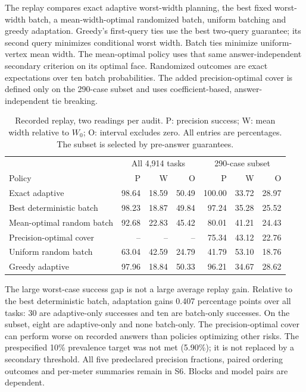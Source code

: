 \documentclass[12pt]{article}
\begin{document}
The replay compares exact adaptive worst-width planning, the best fixed
worst-width batch, a mean-width-optimal randomized batch, uniform batching
and greedy adaptation. Greedy's first-query ties use the best two-query
guarantee; its second query minimizes conditional worst width. Batch ties
minimize uniform-vertex mean width. The mean-optimal policy uses that same
answer-independent secondary criterion on its optimal face. Randomized
outcomes are exact expectations over ten batch probabilities. The added
precision-optimal cover is defined only on the 290-case subset and uses
coefficient-based, answer-independent tie breaking.

\begin{table}[htbp]\centering\small\setlength{\tabcolsep}{4pt}
\caption{Recorded replay, two readings per audit. P: precision success;
W: mean width relative to $W_0$; O: interval excludes zero. All entries
are percentages. The subset is selected by pre-answer guarantees.}
\label{tab:counter-replay}
\begin{tabular}{lrrrrrr}\toprule
 & \multicolumn{3}{c}{All 4,914 tasks} & \multicolumn{3}{c}{290-case subset}\\
Policy & P & W & O & P & W & O\\\midrule
Exact adaptive & 98.64 & 18.59 & 50.49 & 100.00 & 33.72 & 28.97\\
Best deterministic batch & 98.23 & 18.87 & 49.84 & 97.24 & 35.28 & 25.52\\
Mean-optimal random batch & 92.68 & 22.83 & 45.42 & 80.01 & 41.21 & 24.43\\
Precision-optimal cover & -- & -- & -- & 75.34 & 43.12 & 22.76\\
Uniform random batch & 63.04 & 42.59 & 24.79 & 41.79 & 53.10 & 18.76\\
Greedy adaptive & 97.96 & 18.84 & 50.33 & 96.21 & 34.67 & 28.62\\\bottomrule
\end{tabular}\end{table}
\FloatBarrier

The large worst-case success gap is not a large average replay gain.
Relative to the best deterministic batch, adaptation gains 0.407 percentage
points over all tasks: 30 are adaptive-only successes and ten are batch-only
successes. On the subset, eight are adaptive-only and none batch-only.
The precision-optimal cover can perform worse on recorded answers than
policies optimizing other risks. The prespecified 10\% prevalence target
was not met (5.90\%); it is not replaced by a secondary threshold.
All five predeclared precision fractions, paired ordering outcomes and
per-meter summaries remain in S6. Blocks and model pairs are dependent.
\end{document}
